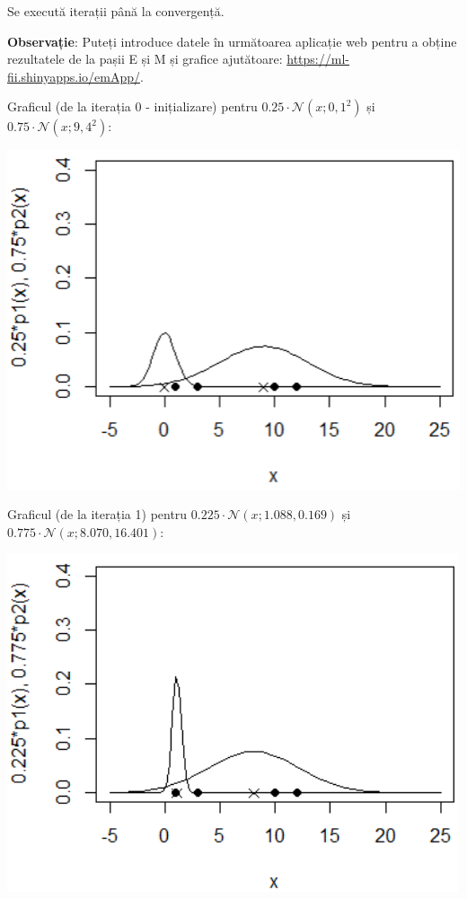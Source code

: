 \documentclass[12pt]{article}
\begin{document}
\begin{enumerate}
\begin{enumerate}
			Se execută iterații până la convergență.
			
	\textbf{Observație}: Puteți introduce datele în următoarea aplicație web pentru a obține rezultatele de la pașii E și M și grafice ajutătoare: \url{https://ml-fii.shinyapps.io/emApp/}.
\newpage

			Graficul (de la iterația 0 - inițializare) pentru $0.25 \cdot \mathcal{N}(x;0,1^2)$ și $0.75 \cdot \mathcal{N}(x;9,4^2)$:
			\begin{center}
				\includegraphics{screenshot012}
			\end{center}
			Graficul (de la iterația 1) pentru $0.225 \cdot \mathcal{N}(x;1.088,0.169)$ și $0.775 \cdot \mathcal{N}(x;8.070,16.401)$:
			\begin{center}
				\includegraphics{screenshot014}
			\end{center}
			
			
		
			
		\end{enumerate}

			
		
	\end{enumerate}
\end{document}
